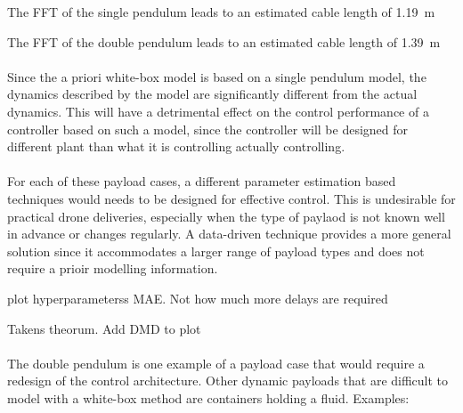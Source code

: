         
        
        
        
        The FFT of the single pendulum leads to an estimated cable length of \SI{1.19}{\metre}        

        
        The FFT of the double pendulum leads to an estimated cable length of \SI{1.39}{\metre}
        
        \paragraph{}
        Since the a priori white-box model is based on a single pendulum model, 
        the dynamics described by the model are significantly different from the actual dynamics.
        This will have a detrimental effect on the control performance of a controller based on such a model,
        since the controller will be designed for different plant than what it is controlling actually controlling.
        
        

        \paragraph{}
        For each of these payload cases, a different parameter estimation based techniques would needs to be designed for effective control.
        This is undesirable for practical drone deliveries, especially when the type of paylaod is not known well in advance or changes regularly.
        A data-driven technique provides a more general solution since it accommodates a larger range of payload types and does not require a prioir modelling information.
        
        plot hyperparameterss MAE. Not how much more delays are required
        
        Takens theorum.
        Add DMD to plot
        

        \paragraph{}
        The double pendulum is one example of a payload case that would require a redesign of the control architecture.
        Other dynamic payloads that are difficult to model with a white-box method are containers holding a fluid.
        Examples: 

